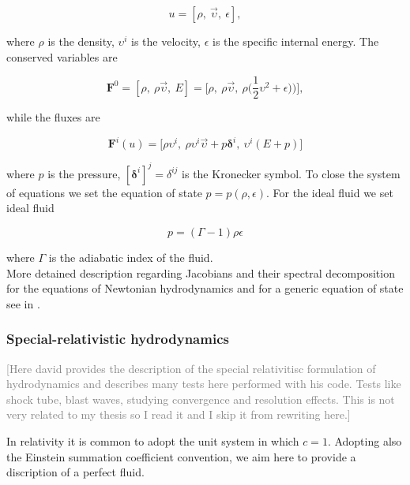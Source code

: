 \documentclass[11pt,a4paper,headinclude=true,DIV=14,BCOR=8mm,chapterprefix,listof=totoc,twoside,openright,abstracton]{scrbook}
\begin{document}
\begin{equation}
    u = [\rho,\: \vec{\upsilon},\: \epsilon],
\end{equation}

where $\rho$ is the density, $\upsilon^{i}$ is the velocity, $\epsilon$ is the specific internal energy. The conserved variables are 

\begin{equation}
    \boldsymbol{F}^{0} = [\rho,\: \rho\vec{\upsilon},\: E] = \big[\rho, \: \rho\vec{\upsilon}, \: \rho\big(\frac{1}{2}\upsilon^2 + \epsilon\big)\big)\big],
\end{equation}

while the fluxes are 

\begin{equation}
    \boldsymbol{F}^i(u) = \big[ \rho\upsilon^i, \: \rho\upsilon^i\vec{\upsilon}+p\boldsymbol{\delta}^i, \: \upsilon^{i}(E+p) \big]
\end{equation}

where $p$ is the pressure, $[\boldsymbol{\delta}^i]^j = \delta^{ij}$ is the Kronecker symbol. To close the system of equations we set the equation of state $p = p(\rho, \epsilon)$. For the ideal fluid we set ideal fluid 

\begin{equation}
    p = (\Gamma -1)\rho\epsilon
\end{equation}

where $\Gamma$ is the adiabatic index of the fluid. \\

More detained description regarding Jacobians and their spectral decomposition for the equations of Newtonian hydrodynamics and for a generic equation of state see in \cite{Kulikovskii:2002}.

\subsubsection{Special-relativistic hydrodynamics}

\textcolor{gray}{[Here david provides the description of the special relativitisc formulation of hydrodynamics and describes many tests here performed with his code. Tests like shock tube, blast waves, studying convergence and resolution effects. This is not very related to my thesis so I read it and I skip it from rewriting here.]}

In relativity it is common to adopt the unit system in which $c=1$. Adopting also the Einstein summation coefficient convention, we aim here to provide a discription of a perfect fluid. 
\end{document}
